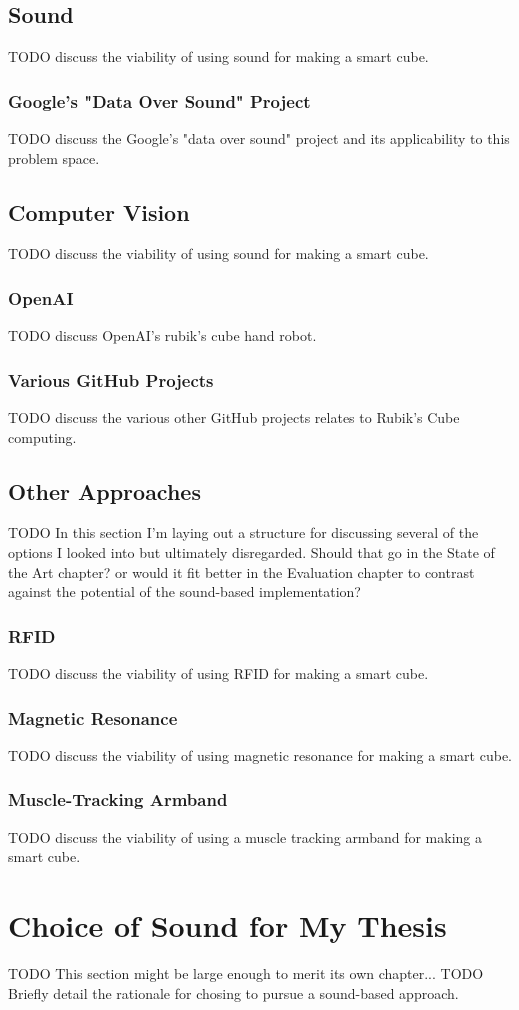 \subsection{Sound}
TODO discuss the viability of using sound for making a smart cube.

\subsubsection{Google's "Data Over Sound" Project}
TODO discuss the Google's "data over sound" project and its applicability to this problem space.


\subsection{Computer Vision}
TODO discuss the viability of using sound for making a smart cube.

\subsubsection{OpenAI}
TODO discuss OpenAI's rubik's cube hand robot.
\subsubsection{Various GitHub Projects}
TODO discuss the various other GitHub projects relates to Rubik's Cube computing.


\subsection{Other Approaches}

TODO In this section I'm laying out a structure for discussing several of the options I looked into but ultimately disregarded. Should that go in the State of the Art chapter? or would it fit better in the Evaluation chapter to contrast against the potential of the sound-based implementation?

\subsubsection{RFID}
TODO discuss the viability of using RFID for making a smart cube.
\subsubsection{Magnetic Resonance}
TODO discuss the viability of using magnetic resonance for making a smart cube.
\subsubsection{Muscle-Tracking Armband}
TODO discuss the viability of using a muscle tracking armband for making a smart cube.


\section{Choice of Sound for My Thesis}

TODO This section might be large enough to merit its own chapter...
TODO Briefly detail the rationale for chosing to pursue a sound-based approach.